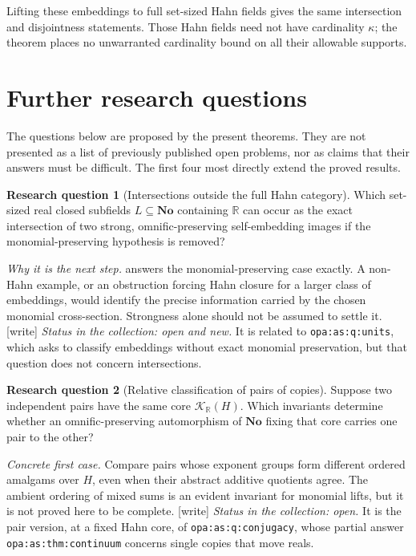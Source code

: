 \documentclass[11pt,letterpaper]{article}
\theoremstyle{definition}
\newtheorem{question}{Research question}
\theoremstyle{remark}
\newcommand{\No}{\mathbf{No}}
\newcommand{\R}{\mathbb R}
\newcommand{\K}[2]{\mathcal K_{#1}(#2)}
\newcommand{\lbl}[1]{\nolinkurl{#1}}%
\newcommand{\wtag}{\textup{[write]}}%
\numberwithin{equation}{section}
\begin{document}
Lifting these embeddings to full set-sized Hahn fields gives the same
intersection and disjointness statements. Those Hahn fields need not have
cardinality $\kappa$; the theorem places no unwarranted cardinality bound on
all their allowable supports.

\section{Further research questions}\label{isc:sec:questions}

The questions below are proposed by the present theorems. They are not
presented as a list of previously published open problems, nor as claims
that their answers must be difficult. The first four most directly extend
the proved results.

\begin{question}[Intersections outside the full Hahn category]
Which set-sized real closed subfields $L\subseteq\No$ containing $\R$
can occur as the exact intersection of two strong, omnific-preserving
self-embedding images if the monomial-preserving hypothesis is removed?
\end{question}
\noindent\emph{Why it is the next step.} 
answers the monomial-preserving case exactly. A non-Hahn example, or an
obstruction forcing Hahn closure for a larger class of embeddings, would
identify the precise information carried by the chosen monomial
cross-section. Strongness alone should not be assumed to settle it.
\wtag{} \emph{Status in the collection: open and new.} It is related to
\lbl{opa:as:q:units}, which asks to classify embeddings without exact
monomial preservation, but that question does not concern intersections.

\begin{question}[Relative classification of pairs of copies]
Suppose two independent pairs have the same core $\K{\R}{H}$. Which
invariants determine whether an omnific-preserving automorphism of $\No$
fixing that core carries one pair to the other?
\end{question}
\noindent\emph{Concrete first case.} Compare pairs whose exponent groups
form different ordered amalgams over $H$, even when their abstract additive
quotients agree. The ambient ordering of mixed sums is an evident invariant
for monomial lifts, but it is not proved here to be complete.
\wtag{} \emph{Status in the collection: open.} It is the pair version, at
a fixed Hahn core, of \lbl{opa:as:q:conjugacy}, whose partial answer
\lbl{opa:as:thm:continuum} concerns single copies that move reals.
\end{document}
